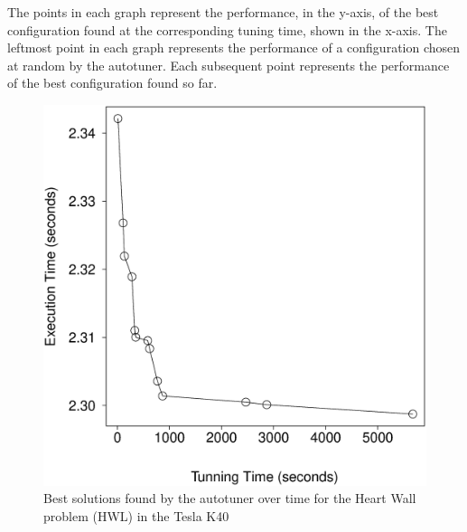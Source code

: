 The points in each graph represent the performance, in the y-axis, of the best
configuration found at the corresponding tuning time, shown in the x-axis. The
leftmost point in each graph represents the performance of a configuration
chosen at random by the autotuner. Each subsequent point represents the
performance of the best configuration found so far.

\begin{figure}[htpb]
    \centering
    \begin{minipage}{.48\textwidth}
        \centering
        \includegraphics[scale=.22]{./images/heartwall-0-Tesla-K40-Best.eps}
        \caption{Best solutions found by the autotuner over time for the Heart Wall problem (HWL) in the Tesla K40}
        \label{fig:K40hwBest}
    \end{minipage}%
    \hfill
    \begin{minipage}{.48\textwidth}
        \centering

\end{minipage}
\end{figure}
